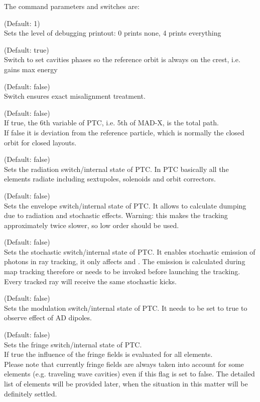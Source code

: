 The command parameters and switches are:
\begin{madlist}
	 (Default: 1)\\
	Sets the level of debugging printout: 0 prints none, 4 prints everything   
	
	 (Default: true)\\
	Switch to set cavities phases so the reference orbit is always on
	the crest, i.e. gains max energy    
	
	 (Default: false)\\
	Switch ensures exact misalignment treatment.   
	
	 (Default: false)\\
	If true, the 6th variable of PTC, i.e. 5th of MAD-X, is the total
	path.  \\
	If false it is deviation from the reference particle,
	which is normally the closed orbit for closed layouts.    
	
	 (Default: false)\\    
	Sets the radiation switch/internal state of PTC. In PTC basically all the elements
	radiate including sextupoles, solenoids and orbit correctors.

	 (Default: false)\\    
	Sets the envelope switch/internal state of PTC. It allows to calculate 
	dumping due to radiation and stochastic effects. 
	Warning: this makes the tracking approximately twice slower, so low order
	should be used. 

	 (Default: false)\\    
	Sets the stochastic switch/internal state of PTC. 
	It enables stochastic emission of photons in ray tracking,  
                    it only affects  and .
	The emission is calculated during map tracking therefore 
	 or  needs to be invoked before 
	launching the tracking. Every tracked ray will receive the same stochastic kicks.

	 (Default: false)\\    
	Sets the modulation switch/internal state of PTC. 
	It needs to be set to true to observe effect of AD dipoles.
	
	 (Default: false)\\    
	Sets the fringe switch/internal state of PTC. \\ 
	If true the influence of the fringe fields is evaluated for all
	elements. \\       
	Please note that currently fringe fields are always taken into
	account for some elements (e.g. traveling wave cavities) even if
	this flag is set to false. The detailed list of elements
	will be provided later, when the situation in this matter will be
	definitely settled.    
	

\end{madlist}
